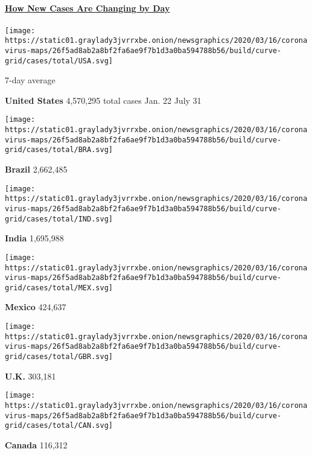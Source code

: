 \subsection{}

\hypertarget{how-new-cases-are-changing-by-day}{%
\paragraph{\texorpdfstring{\href{https://www.nytimes3xbfgragh.onion/interactive/2020/world/coronavirus-maps.html}{How
New Cases Are Changing by
Day}}{How New Cases Are Changing by Day}}\label{how-new-cases-are-changing-by-day}}

\texttt{[image: https://static01.graylady3jvrrxbe.onion/newsgraphics/2020/03/16/coronavirus-maps/26f5ad8ab2a8bf2fa6ae9f7b1d3a0ba594788b56/build/curve-grid/cases/total/USA.svg]}

7-day average

\textbf{United States} 4,570,295 total cases Jan. 22 July 31

\texttt{[image: https://static01.graylady3jvrrxbe.onion/newsgraphics/2020/03/16/coronavirus-maps/26f5ad8ab2a8bf2fa6ae9f7b1d3a0ba594788b56/build/curve-grid/cases/total/BRA.svg]}

\textbf{Brazil} 2,662,485

\texttt{[image: https://static01.graylady3jvrrxbe.onion/newsgraphics/2020/03/16/coronavirus-maps/26f5ad8ab2a8bf2fa6ae9f7b1d3a0ba594788b56/build/curve-grid/cases/total/IND.svg]}

\textbf{India} 1,695,988

\texttt{[image: https://static01.graylady3jvrrxbe.onion/newsgraphics/2020/03/16/coronavirus-maps/26f5ad8ab2a8bf2fa6ae9f7b1d3a0ba594788b56/build/curve-grid/cases/total/MEX.svg]}

\textbf{Mexico} 424,637

\texttt{[image: https://static01.graylady3jvrrxbe.onion/newsgraphics/2020/03/16/coronavirus-maps/26f5ad8ab2a8bf2fa6ae9f7b1d3a0ba594788b56/build/curve-grid/cases/total/GBR.svg]}

\textbf{U.K.} 303,181

\texttt{[image: https://static01.graylady3jvrrxbe.onion/newsgraphics/2020/03/16/coronavirus-maps/26f5ad8ab2a8bf2fa6ae9f7b1d3a0ba594788b56/build/curve-grid/cases/total/CAN.svg]}

\textbf{Canada} 116,312

\href{https://www.nytimes3xbfgragh.onion/interactive/2020/world/coronavirus-maps.html}{}

